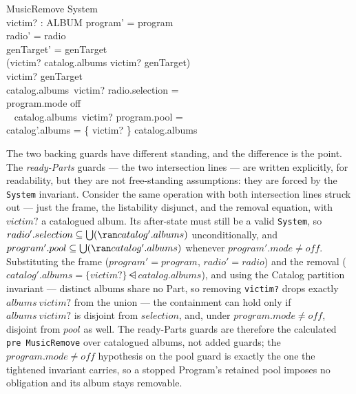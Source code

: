 \documentclass[a4paper,10pt,fleqn]{article}
\begin{document}
\begin{schema}{MusicRemove}
  \Delta System \\
  victim? : ALBUM
  \where
  program' = program \\
  radio' = radio \\
  genTarget' = genTarget \\
  (victim? \in \dom catalog.albums \lor victim? \in genTarget) \\
  victim? \notin genTarget \\
  catalog.albums~victim? \cap radio.selection = \emptyset \\
  program.mode \neq off \implies \\
  \quad~ catalog.albums~victim? \cap program.pool = \emptyset \\
  catalog'.albums = \{ victim? \} \ndres catalog.albums
\end{schema}

The two backing guards have different standing, and the difference is the point.
The \emph{ready-Parts} guards --- the two intersection lines --- are written
explicitly, for readability, but they are not free-standing assumptions: they
are forced by the \texttt{System} invariant. Consider the same operation with
both intersection lines struck out --- just the frame, the listability
disjunct, and the removal equation, with $victim?$ a catalogued album. Its
after-state must still be a valid \texttt{System}, so
$radio'.selection \subseteq \bigcup (\ran catalog'.albums)$ unconditionally, and
$program'.pool \subseteq \bigcup (\ran catalog'.albums)$ whenever
$program'.mode \neq off$. Substituting the frame ($program' = program$,
$radio' = radio$) and the removal
($catalog'.albums = \{victim?\} \ndres catalog.albums$), and using the Catalog
partition invariant --- distinct albums share no Part, so removing
\texttt{victim?} drops exactly $albums~victim?$ from the union --- the
containment can hold only if $albums~victim?$ is disjoint from $selection$, and,
under $program.mode \neq off$, disjoint from $pool$ as well. The ready-Parts
guards are therefore the calculated \texttt{pre}~\texttt{MusicRemove} over
catalogued albums, not added guards; the $program.mode \neq off$ hypothesis on
the pool guard is exactly the one the tightened invariant carries, so a stopped
Program's retained pool imposes no obligation and its album stays removable.
\end{document}
